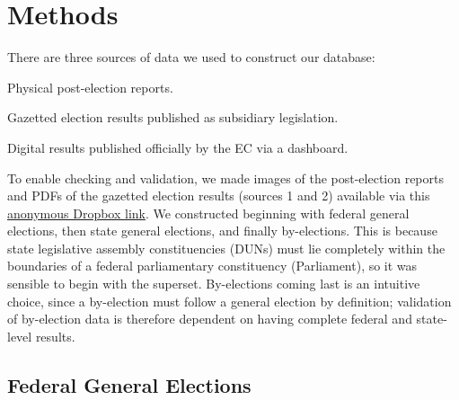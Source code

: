 \documentclass[11pt]{article}
\begin{document}
\section*{Methods}
There are three sources of data we used to construct our database:
\begin{enumar}
\item Physical post-election reports\cite{ge00report,ge01report,ge02report,ge03report,ge04report,ge05report,ge06report,ge07report,ge08report,ge09report,ge10report,ge11report,ge12report,ge13report,sabah1967report,sabah1971report,sabah1976report,sabah1981report,sabah1985report,sabah1986report,sabah1990report,sabah1994report,sabah1999report,sarawak1979report,sarawak1983report,sarawak1987report,sarawak1991report,sarawak1996report,sarawak2001report,sarawak2006report,kelantan1978report}.
\item Gazetted election results published as subsidiary legislation\cite{lompub}.
\item Digital results published officially by the EC via a dashboard\cite{mysprsemak}.
\end{enumar}
To enable checking and validation, we made images of the post-election reports and PDFs of the gazetted election results (sources 1 and 2) available via this \href{https://kongsi.la/tmECWBT}{anonymous Dropbox link}. We constructed \acronym beginning with federal general elections, then state general elections, and finally by-elections. This is because state legislative assembly constituencies (DUNs) must lie completely within the boundaries of a federal parliamentary constituency (Parliament), so it was sensible to begin with the superset. By-elections coming last is an intuitive choice, since a by-election must follow a general election by definition; validation of by-election data is therefore dependent on having complete federal and state-level results.

\subsection*{Federal General Elections}
\end{document}

